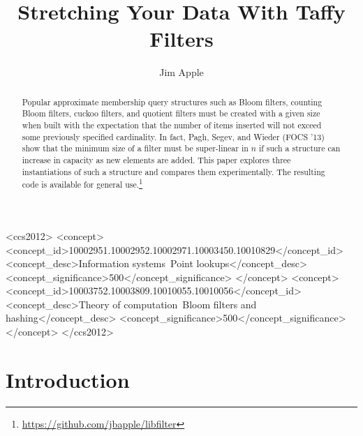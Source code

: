 \documentclass[manuscript,screen,review]{acmart}
\begin{document}
\title{Stretching Your Data With Taffy Filters}
\author{Jim Apple}

\begin{abstract}
\end{abstract}

\begin{CCSXML}
<ccs2012>
   <concept>
       <concept_id>10002951.10002952.10002971.10003450.10010829</concept_id>
       <concept_desc>Information systems~Point lookups</concept_desc>
       <concept_significance>500</concept_significance>
       </concept>
   <concept>
       <concept_id>10003752.10003809.10010055.10010056</concept_id>
       <concept_desc>Theory of computation~Bloom filters and hashing</concept_desc>
       <concept_significance>500</concept_significance>
       </concept>
 </ccs2012>
\end{CCSXML}





\begin{abstract}
Popular approximate membership query structures such as Bloom filters, counting Bloom filters, cuckoo filters, and quotient filters must be created with a given size when built with the expectation that the number of items inserted will not exceed some previously specified cardinality.
In fact, Pagh, Segev, and Wieder (FOCS '13) show that the minimum size of a filter must be super-linear in $n$ if such a structure can increase in capacity as new elements are added.
This paper explores three instantiations of such a structure and compares them experimentally.
The resulting code is available for general use.\footnote{\url{https://github.com/jbapple/libfilter}}
\end{abstract}

\maketitle

\section{Introduction}
\end{document}
